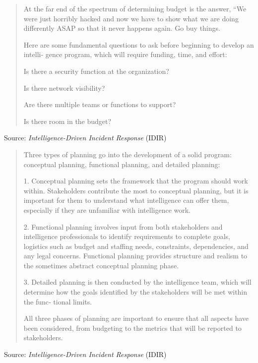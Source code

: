 \documentclass[Screen16to9,17pt]{foils}
\begin{document}
\begin{quote}
At the far end of the spectrum of determining budget is the answer,
“We were just horribly hacked and now we have to show what we
are doing differently ASAP so that it never happens again. Go buy
things.

Here are some fundamental questions to ask before beginning to develop an intelli‐
gence program, which will require funding, time, and effort:

\begin{list2}
\item Is there a security function at the organization?
\item Is there network visibility?
\item Are there multiple teams or functions to support?
\item Is there room in the budget?
\end{list2}
\end{quote}
Source: \emph{Intelligence-Driven Incident Response} (IDIR)



\begin{quote}
Three types of planning go into the development of a solid program: conceptual planning, functional planning, and detailed planning:
\begin{list2}
\item 1. Conceptual planning sets the framework that the program should work within. Stakeholders contribute the most to conceptual planning, but it is important for them to understand what intelligence can offer them, especially if they are unfamiliar with intelligence work.
\item 2. Functional planning involves input from both stakeholders and intelligence professionals to identify requirements to complete goals, logistics such as budget and staffing needs, constraints, dependencies, and any legal concerns. Functional planning provides structure and realism to the sometimes abstract conceptual planning phase.
\item 3. Detailed planning is then conducted by the intelligence team, which will determine how the goals identified by the stakeholders will be met within the func‐
tional limits.
\end{list2}

All three phases of planning are important to ensure that all aspects have been considered, from budgeting to the metrics that will be reported to stakeholders.

\end{quote}
Source: \emph{Intelligence-Driven Incident Response} (IDIR)
\end{document}
